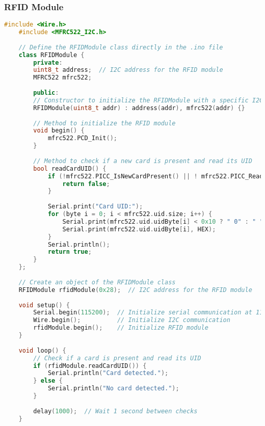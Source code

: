 \subsubsection*{RFID Module}
\begin{lstlisting}[language=C++]
	#include <Wire.h>
	#include <MFRC522_I2C.h>
	
	// Define the RFIDModule class directly in the .ino file
	class RFIDModule {
		private:
		uint8_t address;  // I2C address for the RFID module
		MFRC522 mfrc522;
		
		public:
		// Constructor to initialize the RFIDModule with a specific I2C address
		RFIDModule(uint8_t addr) : address(addr), mfrc522(addr) {}
		
		// Method to initialize the RFID module
		void begin() {
			mfrc522.PCD_Init();
		}
		
		// Method to check if a new card is present and read its UID
		bool readCardUID() {
			if (!mfrc522.PICC_IsNewCardPresent() || ! mfrc522.PICC_ReadCardSerial()) {
				return false;
			}
			
			Serial.print("Card UID:");
			for (byte i = 0; i < mfrc522.uid.size; i++) {
				Serial.print(mfrc522.uid.uidByte[i] < 0x10 ? " 0" : " ");
				Serial.print(mfrc522.uid.uidByte[i], HEX);
			}
			Serial.println();
			return true;
		}
	};
	
	// Create an object of the RFIDModule class
	RFIDModule rfidModule(0x28);  // I2C address for the RFID module
	
	void setup() {
		Serial.begin(115200);  // Initialize serial communication at 115200 baud rate
		Wire.begin();          // Initialize I2C communication
		rfidModule.begin();    // Initialize RFID module
	}
	
	void loop() {
		// Check if a card is present and read its UID
		if (rfidModule.readCardUID()) {
			Serial.println("Card detected.");
		} else {
			Serial.println("No card detected.");
		}
		
		delay(1000);  // Wait 1 second between checks
	}
\end{lstlisting}
\clearpage
